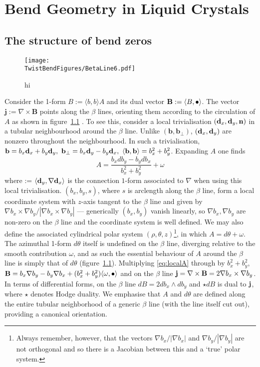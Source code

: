 \chapter{Bend Geometry in Liquid Crystals}
\label{ch:TwistBend}
\section{The structure of bend zeros}
\begin{figure}[htbp]
    \centering
    \texttt{[image: \\TwistBendFigures/BetaLine6.pdf]}
    \caption{hi}
    \label{fig:BetaLines}
\end{figure}

Consider the 1-form $B := \langle b,b \rangle A$ and its dual vector $\mathbf{B} := \langle B, \bullet \rangle$. The vector $\mathbf{j} := \nabla \times \mathbf{B}$ points along the $\beta$ lines, orienting them according to the circulation of $A$ as shown in figure~\ref{fig:BetaLines} \cite{Machon2016b}. To see this, consider a local trivialisation $(\mathbf{d}_x, \mathbf{d}_y,\mathbf{n})$ in a tubular neighbourhood around the $\beta$ line. Unlike $(\mathbf{b}, \mathbf{b}_\perp)$, $(\mathbf{d}_x, \mathbf{d}_y)$ are nonzero throughout the neighbourhood. In such a trivialisation, ${\bf b} = b_x \mathbf{d}_x + b_y \mathbf{d}_y,\ {\bf b}_\perp = b_x \mathbf{d}_y - b_y \mathbf{d}_x,\ \langle \mathbf{b}, \mathbf{b} \rangle = b_x^2 + b_y^2$. Expanding $A$ one finds
\begin{equation}
    A = \frac{b_x d b_y - b_y d b_x}{b_x^2 + b_y^2}+ \omega
    \label{eq:localA}
\end{equation}
where \omega := $\langle \mathbf{d}_y, \nabla \mathbf{d}_x \rangle$ is the connection $1$-form associated to $\nabla$ when using this local trivialisation. $(b_x,b_y,s)$, where $s$ is arclength along the $\beta$ line, form a local coordinate system with $z$-axis tangent to the $\beta$ line and given by $\nabla b_x \times \nabla b_y/|\nabla b_x \times \nabla b_y|$ --- generically $(b_x, b_y)$ vanish linearly, so $\nabla b_x, \nabla b_y$ are non-zero on the $\beta$ line and the coordinate system is well defined. We may also define the associated cylindrical polar system $(\rho,\theta,z)$\footnote{Always remember, however, that the vectors $\nabla b_x/|\nabla b_x|$ and $\nabla b_y/|\nabla b_y|$ are not orthogonal and so there is a Jacobian between this and a `true' polar system.}, in which $A = d\theta + \omega$. The azimuthal 1-form $d\theta$ itself is undefined on the $\beta$ line, diverging relative to the smooth contribution $\omega$, and as such the essential behaviour of $A$ around the $\beta$ line is simply that of $d \theta$ (figure~\ref{fig:BetaLines}). Multiplying \eqref{eq:localA} through by $b_x^2 + b_y^2$, $\mathbf{B} = b_x \nabla b_y - b_y \nabla b_x + (b_x^2 + b_y^2) \langle \omega, \bullet \rangle$  and on the $\beta$ line $\mathbf{j} = \nabla \times \mathbf{B} = 2 \nabla b_x \times \nabla b_y$. In terms of differential forms, on the $\beta$ line $dB = 2 d b_x \wedge d b_y$ and $\star dB$ is dual to $\mathbf{j}$, where $\star$ denotes Hodge duality. We emphasise that $A$ and $d\theta$ are defined along the entire tubular neighborhood of a generic $\beta$ line (with the line itself cut out), providing a canonical orientation.

